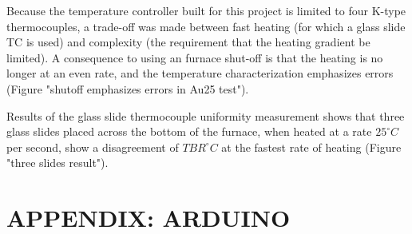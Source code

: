 \documentclass[12pt,oneside,english]{article}
\begin{document}
    Because the temperature controller built for this project is limited to four K-type thermocouples, a trade-off was made between fast heating (for which a glass slide TC is used) and complexity (the requirement that the heating gradient be limited). 
    A consequence to using an furnace shut-off is that the heating is no longer at an even rate, and the temperature characterization emphasizes errors (Figure "shutoff emphasizes errors in Au25 test").

    Results of the glass slide thermocouple uniformity measurement shows that three glass slides placed across the bottom of the furnace, when heated at a rate $25^{\circ}C$ per second, show a disagreement of $TBR^{\circ}C$ at the fastest rate of heating (Figure "three slides result").

\section{APPENDIX: ARDUINO}

\lstset{caption=Temperature Control Functions, label=lst:arduRelay}


\lstset{caption=Arduino PID Controller v1 Library, label=lst:arduPid}





\end{document}
